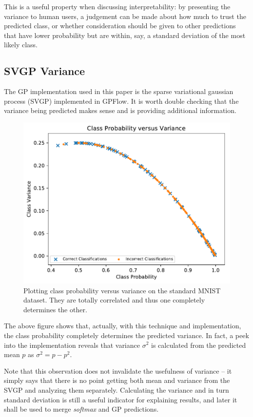 \documentclass{article}
\begin{document}
This is a useful property when discussing interpretability: by presenting the variance to human users, a judgement can be made about how much to trust the predicted class, or whether consideration should be given to other predictions that have lower probability but are within, say, a standard deviation of the most likely class.


\subsection{SVGP Variance}
\label{sec:svgp-variance}
The GP implementation used in this paper is the sparse variational gaussian process (SVGP) implemented in GPFlow. It is worth double checking that the variance being predicted makes sense and is providing additional information.

\begin{figure}[hbt]
\centering
\includegraphics[width=\hsize]{figures/mnist/mu_versus_var_combined.pdf}
\caption{Plotting class probability versus variance on the standard MNIST dataset. They are totally correlated and thus one completely determines the other.}
\label{fig:all_variances}
\end{figure}

The above figure shows that, actually, with this technique and implementation, the class probability completely determines the predicted variance. In fact, a peek into the implementation reveals that variance $\sigma^2$ is calculated from the predicted mean $p$ as $\sigma^2 = p - p^2$.

Note that this observation does not invalidate the usefulness of variance -- it simply says that there is no point getting both mean and variance from the SVGP and analyzing them separately. Calculating the variance and in turn standard deviation is still a useful indicator for explaining results, and later it shall be used to merge \textit{softmax} and GP predictions.
\end{document}
